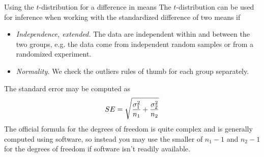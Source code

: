 

\begin{onebox}{Using the $t$-distribution for a difference in means}
  \label{ConditionsForTwoSampleTDist}%
  The $t$-distribution can be used for inference when working
  with the standardized difference of two means if
  \begin{itemize}
  \setlength{\itemsep}{0mm}
  \item \emph{Independence, extended.}
    The data are independent within and between
    the two groups, e.g. the data come from
    independent random samples or from a
    randomized experiment.
  \item \emph{Normality.}
    We check the outliers rules of thumb for
    each group separately.
  \end{itemize}
  The standard error may be computed as
  \begin{align*}
  SE%
    = \sqrt{\frac{\sigma_1^2}{n_1} + \frac{\sigma_2^2}{n_2}}
  \index{standard error (SE)!difference in means}
  \end{align*}
  The official formula for the degrees of freedom is quite
  complex %
  and is generally computed using software,
  so instead you may use the smaller of
  $n_1 - 1$ and $n_2 - 1$ for the degrees of freedom
  if software isn't readily available.
\end{onebox}


